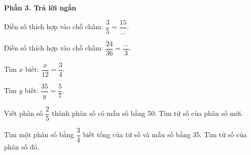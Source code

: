 \textbf{Phần 3. Trả lời ngắn}

\begin{ex} %
Điền số thích hợp vào chỗ chấm: $\dfrac{3}{5} = \dfrac{15}{\dots}$.
\end{ex}

\begin{ex} %
Điền số thích hợp vào chỗ chấm: $\dfrac{24}{36} = \dfrac{\dots}{3}$.
\end{ex}

\begin{ex} %
Tìm $x$ biết: $\dfrac{x}{12} = \dfrac{3}{4}$.
\end{ex}

\begin{ex} %
Tìm $y$ biết: $\dfrac{35}{y} = \dfrac{5}{7}$.
\end{ex}

\begin{ex} %
Viết phân số $\dfrac{2}{5}$ thành phân số có mẫu số bằng 50. Tìm tử số của phân số mới.
\end{ex}

\begin{ex} %
Tìm một phân số bằng $\dfrac{3}{4}$ biết tổng của tử số và mẫu số bằng 35. Tìm tử số của phân số đó.
\end{ex}
